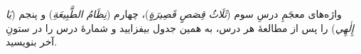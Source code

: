 \begin{JGood}
واژه‌های معجَمِ درسِ سوم (\emph{ثَلَاثُ قِصَصٍ قَصِيرَةٍ})، چهارم
(\emph{نِظَامُ الطَّبِيعَةِ}) و پنجم (\emph{يَا إِلٰهِي}) را پس از مطالعهٔ
هر درس، به همین جدول بیفزایید و شمارهٔ درس را در ستونِ آخر بنویسید.
\end{JGood}

\begin{JMTable}
\end{JMTable}
\begin{JMTable}
\end{JMTable}
\begin{JMTable}
\end{JMTable}
